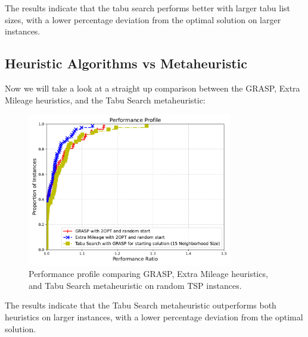 \documentclass{article}
\begin{document}
The results indicate that the tabu search performs better with larger tabu list sizes, 
with a lower percentage deviation from the optimal solution on larger instances.

\subsection{Heuristic Algorithms vs Metaheuristic}
Now we will take a look at a straight up comparison between the GRASP, Extra Mileage heuristics, and the Tabu Search metaheuristic: 

\begin{figure}[!ht]
	\centering
	\includegraphics[width=0.8\textwidth]{plots/grasp_extra_tabu_2.pdf}
	\caption{Performance profile comparing GRASP, Extra Mileage heuristics, and Tabu Search metaheuristic on random TSP instances.}
	\label{fig:grasp_vs_extra_mileage_vs_tabu}
\end{figure}

The results indicate that the Tabu Search metaheuristic outperforms both heuristics on larger instances, with a lower percentage deviation from the optimal solution.
\end{document}
